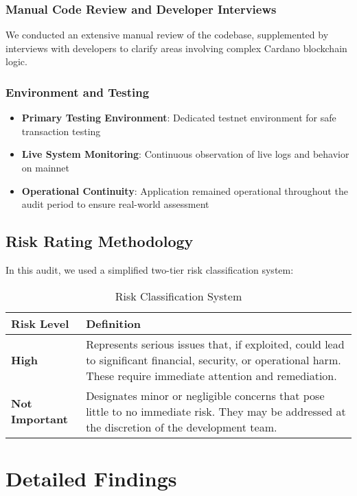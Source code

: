 \documentclass[11pt,a4paper]{report}
\begin{document}
\subsection{Manual Code Review and Developer Interviews}
We conducted an extensive manual review of the codebase, supplemented by interviews with developers to clarify areas involving complex Cardano blockchain logic.

\subsection{Environment and Testing}
\begin{itemize}
    \item \textbf{Primary Testing Environment}: Dedicated testnet environment for safe transaction testing
    \item \textbf{Live System Monitoring}: Continuous observation of live logs and behavior on mainnet
    \item \textbf{Operational Continuity}: Application remained operational throughout the audit period to ensure real-world assessment
\end{itemize}

\section{Risk Rating Methodology}
In this audit, we used a simplified two-tier risk classification system:

\begin{table}[h]
\centering
\begin{tabular}{|l|p{10cm}|}
\hline
\rowcolor{lightGray}
\textbf{Risk Level} & \textbf{Definition} \\
\hline
\textcolor{danzoRed}{\textbf{High}} & Represents serious issues that, if exploited, could lead to significant financial, security, or operational harm. These require immediate attention and remediation. \\
\hline
\textcolor{danzoGray}{\textbf{Not Important}} & Designates minor or negligible concerns that pose little to no immediate risk. They may be addressed at the discretion of the development team. \\
\hline
\end{tabular}
\caption{Risk Classification System}
\end{table}

\chapter{Detailed Findings}
\end{document}

